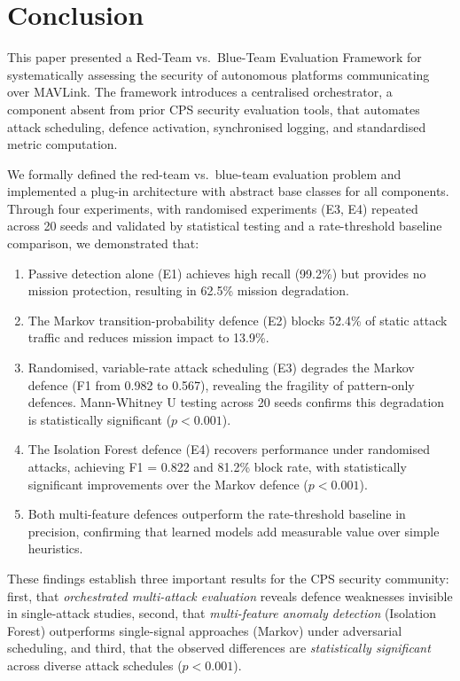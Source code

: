 \section{Conclusion} \label{sec:conclusion}

This paper presented a Red-Team vs.\ Blue-Team Evaluation Framework for systematically assessing the security of autonomous platforms communicating over MAVLink.
The framework introduces a centralised orchestrator, a component absent from prior CPS security evaluation tools, that automates attack scheduling, defence activation, synchronised logging, and standardised metric computation.

We formally defined the red-team vs.\ blue-team evaluation problem and implemented a plug-in architecture with abstract base classes for all components.
Through four experiments, with randomised experiments (E3, E4) repeated across 20 seeds and validated by statistical testing and a rate-threshold baseline comparison, we demonstrated that:
\begin{enumerate}
    \item Passive detection alone (E1) achieves high recall (99.2\%) but provides no mission protection, resulting in 62.5\% mission degradation.
    \item The Markov transition-probability defence (E2) blocks 52.4\% of static attack traffic and reduces mission impact to 13.9\%.
    \item Randomised, variable-rate attack scheduling (E3) degrades the Markov defence (F1 from 0.982 to 0.567), revealing the fragility of pattern-only defences. Mann-Whitney U testing across 20 seeds confirms this degradation is statistically significant ($p < 0.001$).
    \item The Isolation Forest defence (E4) recovers performance under randomised attacks, achieving F1 = 0.822 and 81.2\% block rate, with statistically significant improvements over the Markov defence ($p < 0.001$).
    \item Both multi-feature defences outperform the rate-threshold baseline in precision, confirming that learned models add measurable value over simple heuristics.
\end{enumerate}

These findings establish three important results for the CPS security community:
first, that \emph{orchestrated multi-attack evaluation} reveals defence weaknesses invisible in single-attack studies,
second, that \emph{multi-feature anomaly detection} (Isolation Forest) outperforms single-signal approaches (Markov) under adversarial scheduling,
and third, that the observed differences are \emph{statistically significant} across diverse attack schedules ($p < 0.001$).

